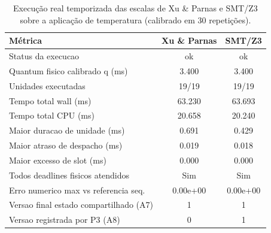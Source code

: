 \begin{table}[t]
\centering
\caption{Execu\c{c}\~ao real temporizada das escalas de Xu \& Parnas e SMT/Z3 sobre a aplica\c{c}\~ao de temperatura (calibrado em 30 repeti\c{c}\~oes).}
\label{tab:execucao_real}
\scriptsize
\begin{tabular}{lcc}
\hline
\textbf{M\'etrica} & \textbf{Xu \& Parnas} & \textbf{SMT/Z3} \\
\hline
Status da execucao & ok & ok \\
Quantum fisico calibrado q (ms) & 3.400 & 3.400 \\
Unidades executadas & 19/19 & 19/19 \\
Tempo total wall (ms) & 63.230 & 63.693 \\
Tempo total CPU (ms) & 20.658 & 20.240 \\
Maior duracao de unidade (ms) & 0.691 & 0.429 \\
Maior atraso de despacho (ms) & 0.019 & 0.018 \\
Maior excesso de slot (ms) & 0.000 & 0.000 \\
Todos deadlines fisicos atendidos & Sim & Sim \\
Erro numerico max vs referencia seq. & 0.00e+00 & 0.00e+00 \\
Versao final estado compartilhado (A7) & 1 & 1 \\
Versao registrada por P3 (A8) & 0 & 1 \\
\hline
\end{tabular}
\end{table}

